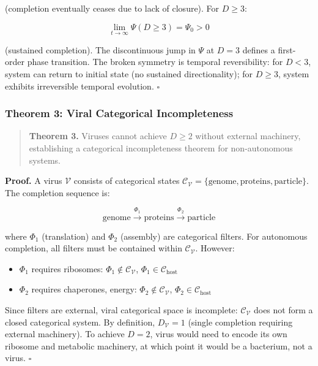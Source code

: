 \documentclass[11pt]{article}
\begin{document}
(completion eventually ceases due to lack of closure). For $D \geq 3$:

\begin{equation}
\lim_{t \to \infty} \Psi(D \geq 3) = \Psi_0 > 0
\end{equation}

(sustained completion). The discontinuous jump in $\Psi$ at $D = 3$ defines a first-order phase transition. The broken symmetry is temporal reversibility: for $D < 3$, system can return to initial state (no sustained directionality); for $D \geq 3$, system exhibits irreversible temporal evolution. $\square$

\subsubsection{Theorem 3: Viral Categorical Incompleteness}

\begin{quote}
\textbf{Theorem 3.} Viruses cannot achieve $D \geq 2$ without external machinery, establishing a categorical incompleteness theorem for non-autonomous systems.
\end{quote}

\textbf{Proof.} A virus $\mathcal{V}$ consists of categorical states $\mathcal{C}_{\mathcal{V}} = \{\text{genome}, \text{proteins}, \text{particle}\}$. The completion sequence is:

\begin{equation}
\text{genome} \xrightarrow{\Phi_1} \text{proteins} \xrightarrow{\Phi_2} \text{particle}
\end{equation}

where $\Phi_1$ (translation) and $\Phi_2$ (assembly) are categorical filters. For autonomous completion, all filters must be contained within $\mathcal{C}_{\mathcal{V}}$. However:

\begin{itemize}
\item $\Phi_1$ requires ribosomes: $\Phi_1 \notin \mathcal{C}_{\mathcal{V}}$, $\Phi_1 \in \mathcal{C}_{\text{host}}$
\item $\Phi_2$ requires chaperones, energy: $\Phi_2 \notin \mathcal{C}_{\mathcal{V}}$, $\Phi_2 \in \mathcal{C}_{\text{host}}$
\end{itemize}

Since filters are external, viral categorical space is incomplete: $\mathcal{C}_{\mathcal{V}}$ does not form a closed categorical system. By definition, $D_{\mathcal{V}} = 1$ (single completion requiring external machinery). To achieve $D = 2$, virus would need to encode its own ribosome and metabolic machinery, at which point it would be a bacterium, not a virus. $\square$
\end{document}
